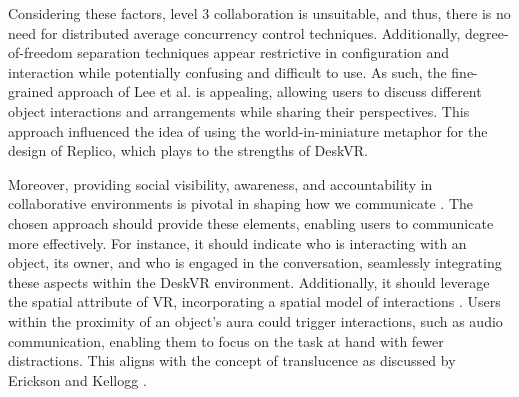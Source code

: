     Considering these factors, level 3 collaboration is unsuitable, and thus, there is no need for distributed average concurrency control techniques. Additionally, degree-of-freedom separation techniques appear restrictive in configuration and interaction while potentially confusing and difficult to use. As such, the fine-grained approach of Lee et al. \cite{leeSupportingFineGrainedConcurrent2012} is appealing, allowing users to discuss different object interactions and arrangements while sharing their perspectives. This approach influenced the idea of using the world-in-miniature \cite{stoakleyVirtualRealityonaWim1995} metaphor for the design of Replico, which plays to the strengths of DeskVR.

    Moreover, providing social visibility, awareness, and accountability in collaborative environments is pivotal in shaping how we communicate \cite{ericksonSocialTranslucenceApproach2000, gutwinDescriptiveFrameworkWorkspace2002}. The chosen approach should provide these elements, enabling users to communicate more effectively. For instance, it should indicate who is interacting with an object, its owner, and who is engaged in the conversation, seamlessly integrating these aspects within the DeskVR environment. Additionally, it should leverage the spatial attribute of VR, incorporating a spatial model of interactions \cite{benfordSpatialModelInteraction1993, dominguesCollaborative3DInteraction2011}. Users within the proximity of an object's aura could trigger interactions, such as audio communication, enabling them to focus on the task at hand with fewer distractions. This aligns with the concept of translucence as discussed by Erickson and Kellogg \cite{ericksonSocialTranslucenceApproach2000}.


